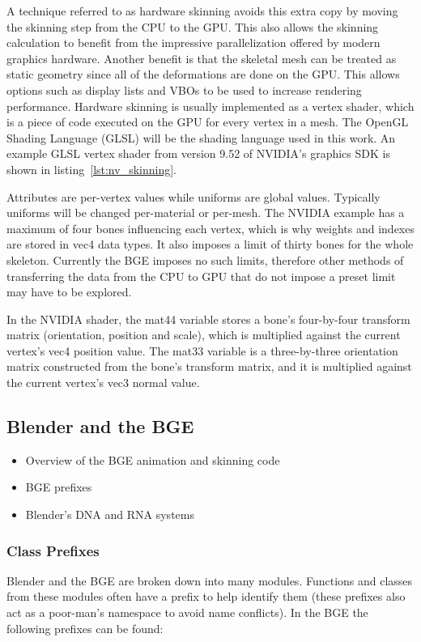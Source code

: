 A technique referred to as hardware skinning avoids this extra copy by moving the skinning step from the CPU to the GPU. This also allows the skinning calculation to benefit from the impressive parallelization offered by modern graphics hardware. Another benefit is that the skeletal mesh can be treated as static geometry since all of the deformations are done on the GPU. This allows options such as display lists and VBOs to be used to increase rendering performance. Hardware skinning is usually implemented as a vertex shader, which is a piece of code executed on the GPU for every vertex in a mesh. The OpenGL Shading Language (GLSL) will be the shading language used in this work. An example GLSL vertex shader from version 9.52 of NVIDIA's graphics SDK\cite{nvidiasdk} is shown in listing~\ref{lst:nv_skinning}.


Attributes are per-vertex values while uniforms are global values. Typically uniforms will be changed per-material or per-mesh. The NVIDIA example has a maximum of four bones influencing each vertex, which is why weights and indexes are stored in vec4 data types. It also imposes a limit of thirty bones for the whole skeleton. Currently the BGE imposes no such limits, therefore other methods of transferring the data from the CPU to GPU that do not impose a preset limit may have to be explored.

In the NVIDIA shader, the mat44 variable stores a bone's four-by-four transform matrix (orientation, position and scale), which is multiplied against the current vertex's vec4 position value. The mat33 variable is a three-by-three orientation matrix constructed from the bone's transform matrix, and it is multiplied against the current vertex's vec3 normal value.

\subsection{Blender and the BGE}
\ifsummaries
\begin{itemize}
 \item Overview of the BGE animation and skinning code
 \item BGE prefixes
 \item Blender's DNA and RNA systems
\end{itemize}
\fi

\subsubsection{Class Prefixes}
Blender and the BGE are broken down into many modules. Functions and classes from these modules often have a prefix to help identify them (these prefixes also act as a poor-man's namespace to avoid name conflicts). In the BGE the following prefixes can be found:

